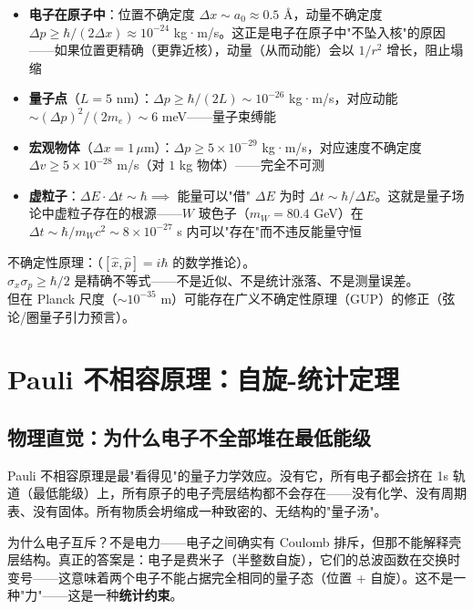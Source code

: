 \begin{oombox}[不确定性的实际尺度]
  \begin{itemize}
    \item \textbf{电子在原子中}：位置不确定度 $\Delta x \sim a_0 \approx 0.5$ \AA{}，动量不确定度 $\Delta p \ge \hbar/(2\Delta x) \approx 10^{-24}$ kg·m/s。这正是电子在原子中"不坠入核"的原因——如果位置更精确（更靠近核），动量（从而动能）会以 $1/r^2$ 增长，阻止塌缩
    \item \textbf{量子点}（$L=5$ nm）：$\Delta p \ge \hbar/(2L) \sim 10^{-26}$ kg·m/s，对应动能 $\sim (\Delta p)^2/(2m_e) \sim 6$ meV——量子束缚能
    \item \textbf{宏观物体}（$\Delta x=1\,\mu$m）：$\Delta p \ge 5\times10^{-29}$ kg·m/s，对应速度不确定度 $\Delta v \ge 5\times10^{-28}$ m/s（对 $1$ kg 物体）——完全不可测
    \item \textbf{虚粒子}：$\Delta E\cdot\Delta t \sim \hbar \implies$ 能量可以"借" $\Delta E$ 为时 $\Delta t \sim \hbar/\Delta E$。这就是量子场论中虚粒子存在的根源——$W$ 玻色子（$m_W=80.4$ GeV）在 $\Delta t \sim \hbar/m_Wc^2 \sim 8\times10^{-27}$ s 内可以"存在"而不违反能量守恒
  \end{itemize}
\end{oombox}

\precisionbox[精度等级]
  不确定性原理：\precexact（$[\hat{x},\hat{p}]=i\hbar$ 的数学推论）。\\
  $\sigma_x\sigma_p \ge \hbar/2$ 是精确不等式——不是近似、不是统计涨落、不是测量误差。\\
  但在 Planck 尺度（$\sim 10^{-35}$ m）可能存在广义不确定性原理（GUP）的修正（弦论/圈量子引力预言）。
\endprecisionbox

\section{Pauli 不相容原理：自旋-统计定理}

\subsection{物理直觉：为什么电子不全部堆在最低能级}

Pauli 不相容原理是最"看得见"的量子力学效应。没有它，所有电子都会挤在 1s 轨道（最低能级）上，所有原子的电子壳层结构都不会存在——没有化学、没有周期表、没有固体。所有物质会坍缩成一种致密的、无结构的"量子汤"。

为什么电子互斥？不是电力——电子之间确实有 Coulomb 排斥，但那不能解释壳层结构。真正的答案是：电子是费米子（半整数自旋），它们的总波函数在交换时变号——这意味着两个电子不能占据完全相同的量子态（位置 + 自旋）。这不是一种"力"——这是一种\textbf{统计约束}。

